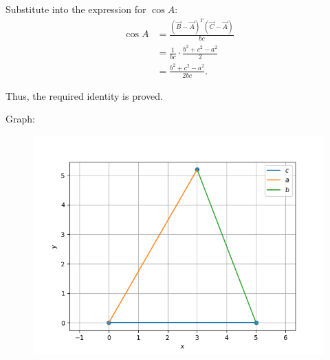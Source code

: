 \documentclass[journal,12pt,onecolumn]{IEEEtran}
\begin{document}
Substitute into the expression for \(\cos A\):
\begin{align}
\cos A &= \frac{(\vec{B} - \vec{A})^T (\vec{C} - \vec{A})}{bc} \\
       &= \frac{1}{bc} \cdot \frac{b^2 + c^2 - a^2}{2} \\
       &= \frac{b^2 + c^2 - a^2}{2bc}.
\end{align}

Thus, the required identity is proved.

		

Graph:
\begin{figure}[H]
    \centering
    \includegraphics[scale=0.5]{plot}
    \caption{}
    \label{fig:plot}
\end{figure}
\end{document}
